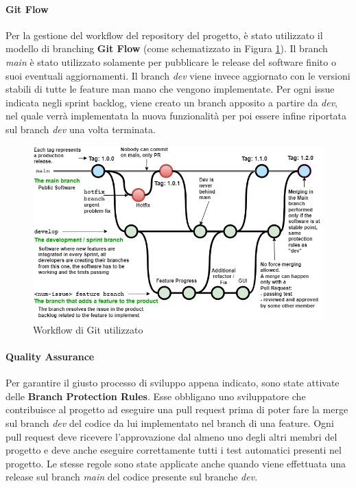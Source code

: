    \paragraph{Git Flow} \label{chap:git-flow}
    Per la gestione del workflow del repository del progetto, è stato utilizzato il modello di branching \textbf{Git Flow} (come schematizzato in Figura \ref{fig:git-flow}). Il branch \textit{main} è stato utilizzato solamente per pubblicare le release del software finito o suoi eventuali aggiornamenti. Il branch \textit{dev} viene invece aggiornato con le versioni stabili di tutte le feature man mano che vengono implementate. Per ogni issue indicata negli sprint backlog, viene creato un branch apposito a partire da \textit{dev}, nel quale verrà implementata la nuova funzionalità per poi essere infine riportata sul branch \textit{dev} una volta terminata.
        \begin{figure}[H]
            \centering
            \includegraphics[width=1\textwidth]{Images/git-flow.png}
            \caption{Workflow di Git utilizzato}
            \label{fig:git-flow}
        \end{figure}

    \paragraph{Quality Assurance} \label{chap:QA}
    Per garantire il giusto processo di sviluppo appena indicato, sono state attivate delle \textbf{Branch Protection Rules}. Esse obbligano uno sviluppatore che contribuisce al progetto ad eseguire una pull request prima di poter fare la merge sul branch \textit{dev} del codice da lui implementato nel branch di una feature. 
    Ogni pull request deve ricevere l'approvazione dal almeno uno degli altri membri del progetto e deve anche eseguire correttamente tutti i test automatici presenti nel progetto. Le stesse regole sono state applicate anche quando viene effettuata una release sul branch \textit{main} del codice presente sul branche \textit{dev}.

